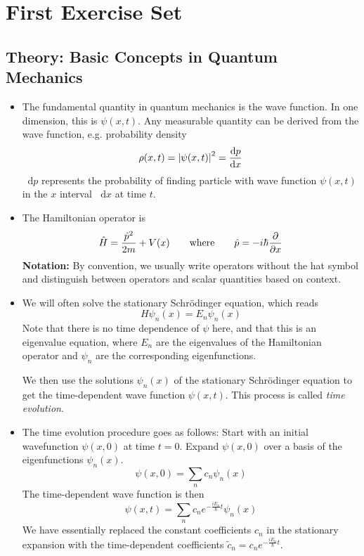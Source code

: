 \documentclass[11pt, a4paper]{article}
\newcommand{\diff}{\mathop{}\!\mathrm{d}} %
\newcommand{\eqtext}[1]{\qquad \text{#1} \qquad}
\newcommand{\Schro}{Schr\"{o}dinger\xspace}
\renewcommand{\op}[1]{\hat{#1}} %
\begin{document}
\section{First Exercise Set}

\subsection{Theory: Basic Concepts in Quantum Mechanics}
\begin{itemize}
	\item The fundamental quantity in quantum mechanics is the wave function. In one dimension, this is $ \psi(x, t) $. Any measurable quantity can be derived from the wave function, e.g. probability density
	\begin{equation*}
		\rho(x, t) = \abs{\psi(x, t)}^{2} = \dv{p}{x}
	\end{equation*}
	$ \diff p $ represents the probability of finding particle with wave function $ \psi(x, t) $ in the $ x $ interval $ \diff x $ at time $ t $. 
		
	\item The Hamiltonian operator is
	\begin{equation*}
		\op{H} = \frac{\op{p}^{2}}{2m} + V(x) \eqtext{where} \op{p} = - i\hbar \pdv{}{x}
	\end{equation*}
	\textbf{Notation:} By convention, we usually write operators without the hat symbol and distinguish between operators and scalar quantities based on context.
	
	\item We will often solve the stationary \Schro equation, which reads
	\begin{equation*}
		H\psi_{n}(x) = E_{n}\psi_{n}(x)
	\end{equation*}
	Note that there is no time dependence of $ \psi $ here, and that this is an eigenvalue equation, where $ E_{n} $ are the eigenvalues of the Hamiltonian operator and $ \psi_{n} $ are the corresponding eigenfunctions.
	
	We then use the solutions $ \psi_{n}(x) $ of the stationary \Schro equation to get the time-dependent wave function $ \psi(x, t) $. This process is called \textit{time evolution}. 
	
	\item The time evolution procedure goes as follows: Start with an initial wavefunction $ \psi(x, 0) $ at time $ t = 0 $. Expand $ \psi(x, 0) $ over a basis of the eigenfunctions $ \psi_{n}(x) $.
	\begin{equation*}
		\psi(x, 0) = \sum_{n} c_{n} \psi_{n}(x)
	\end{equation*}
	The time-dependent wave function is then
	\begin{equation*}
		\psi(x, t) = \sum_{n} c_{n}e^{-\frac{iE_{n}}{\hbar}t}\psi_{n}(x)
	\end{equation*}
	We have essentially replaced the constant coefficients $ c_{n} $ in the stationary expansion with the time-dependent coefficients $ \tilde{c}_{n} = c_{n}e^{-\frac{iE_{n}}{\hbar}t} $.
	

\end{itemize}
\end{document}
